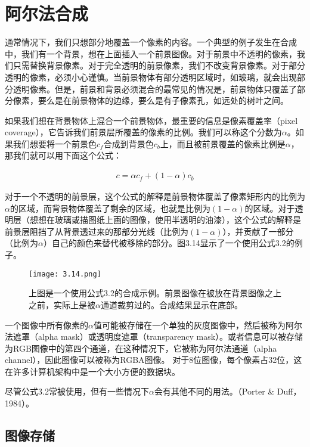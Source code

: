 \documentclass[lang=cn,12pt]{elegantbook}
\begin{document}
\section{阿尔法合成}

通常情况下，我们只想部分地覆盖一个像素的内容。一个典型的例子发生在合成中，我们有一个背景，想在上面插入一个前景图像。对于前景中不透明的像素，我们只需替换背景像素。对于完全透明的前景像素，我们不改变背景像素。对于部分透明的像素，必须小心谨慎。当前景物体有部分透明区域时，如玻璃，就会出现部分透明像素。但是，前景和背景必须混合的最常见的情况是，前景物体只覆盖了部分像素，要么是在前景物体的边缘，要么是有子像素孔，如远处的树叶之间。

如果我们想在背景物体上混合一个前景物体，最重要的信息是像素覆盖率（pixel coverage），它告诉我们前景层所覆盖的像素的比例。我们可以称这个分数为$\alpha $。如果我们想要将一个前景色$c_f$合成到背景色$c_b$上，而且被前景覆盖的像素比例是$\alpha $，那我们就可以用下面这个公式：

\begin{align}
  c = \alpha c_f + (1 - \alpha )c_b
\end{align}

对于一个不透明的前景层，这个公式的解释是前景物体覆盖了像素矩形内的比例为$\alpha $的区域，而背景物体覆盖了剩余的区域，也就是比例为$(1-\alpha )$的区域。对于透明层（想想在玻璃或描图纸上画的图像，使用半透明的油漆），这个公式的解释是前景层阻挡了从背景透过来的那部分光线（比例为$(1-\alpha )$），并贡献了一部分（比例为$\alpha $）自己的颜色来替代被移除的部分。图3.14显示了一个使用公式3.2的例子。


\begin{figure}[htb]
  \centering
  \texttt{[image: 3.14.png]}
  \caption{上图是一个使用公式3.2的合成示例。前景图像在被放在背景图像之上之前，实际上是被$\alpha $通道裁剪过的。合成结果显示在底部。}
\end{figure}

一个图像中所有像素的$\alpha $值可能被存储在一个单独的灰度图像中，然后被称为阿尔法遮罩（alpha mask）或透明度遮罩（transparency mask）。或者信息可以被存储为RGB图像中的第四个通道，在这种情况下，它被称为阿尔法通道（alpha channel），因此图像可以被称为RGBA图像。
对于8位图像，每个像素占32位，这在许多计算机架构中是一个大小方便的数据块。

尽管公式3.2常被使用，但有一些情况下$\alpha $会有其他不同的用法。（Porter \& Duff，1984）。

\subsection{图像存储}
\end{document}
